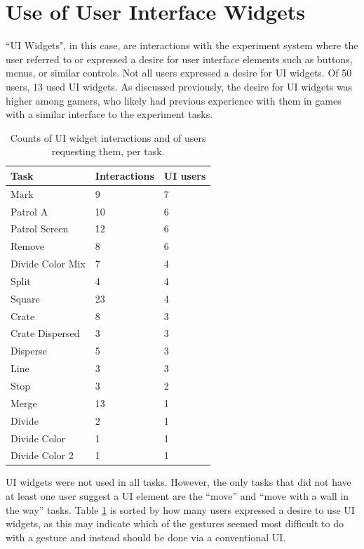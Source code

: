 \section{Use of User Interface Widgets}

``UI Widgets", in this case, are interactions with the experiment system where the user referred to or expressed a desire for user interface elements such as buttons, menus, or similar controls.
Not all users expressed a desire for UI widgets. 
Of 50 users, 13 used UI widgets. 
As discussed previously, the desire for UI widgets was higher among gamers, who likely had previous experience with them in games with a similar interface to the experiment tasks. 

\begin{table}
	\begin{tabular}{l l l}
		Task & Interactions & UI users \\
		\hline
		Mark & 9 & 7\\
		Patrol A & 10 & 6\\
		Patrol Screen & 12 & 6\\
		Remove & 8 & 6 \\
		Divide Color Mix & 7 & 4\\
		Split & 4 & 4 \\
		Square & 23 & 4 \\
		Crate & 8 & 3 \\
		Crate Dispersed & 3 & 3\\
		Disperse & 5 & 3\\
		Line & 3 & 3\\
		Stop & 3 & 2 \\
		Merge & 13 & 1\\
		Divide & 2 & 1\\
		Divide Color & 1 & 1\\
		Divide Color 2 & 1 & 1\\
		
	\end{tabular}
	\caption{Counts of UI widget interactions and of users requesting them, per task.}
	\label{tab:widget_counts_task}
\end{table}


UI widgets were not used in all tasks. 
However, the only tasks that did not have at least one user suggest a UI element are the ``move'' and ``move with a wall in the way'' tasks. 
Table \ref{tab:widget_counts_task} is sorted by how many users expressed a desire to use UI widgets, as this may indicate which of the gestures seemed most difficult to do with a gesture and instead should be done via a conventional UI. 


